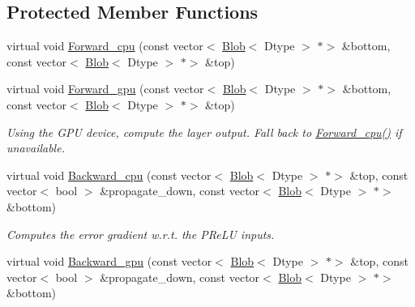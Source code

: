 \subsection*{Protected Member Functions}
\begin{DoxyCompactItemize}
\item 
virtual void \mbox{\hyperlink{classcaffe_1_1_p_re_l_u_layer_ab29811e077cc15d6751366d3f918acd6}{Forward\+\_\+cpu}} (const vector$<$ \mbox{\hyperlink{classcaffe_1_1_blob}{Blob}}$<$ Dtype $>$ $\ast$$>$ \&bottom, const vector$<$ \mbox{\hyperlink{classcaffe_1_1_blob}{Blob}}$<$ Dtype $>$ $\ast$$>$ \&top)
\item 
\mbox{\label{classcaffe_1_1_p_re_l_u_layer_a5f87617dbd3f561a6f7548dd09d5f486}} 
virtual void \mbox{\hyperlink{classcaffe_1_1_p_re_l_u_layer_a5f87617dbd3f561a6f7548dd09d5f486}{Forward\+\_\+gpu}} (const vector$<$ \mbox{\hyperlink{classcaffe_1_1_blob}{Blob}}$<$ Dtype $>$ $\ast$$>$ \&bottom, const vector$<$ \mbox{\hyperlink{classcaffe_1_1_blob}{Blob}}$<$ Dtype $>$ $\ast$$>$ \&top)
\begin{DoxyCompactList}\small\item\em Using the G\+PU device, compute the layer output. Fall back to \mbox{\hyperlink{classcaffe_1_1_p_re_l_u_layer_ab29811e077cc15d6751366d3f918acd6}{Forward\+\_\+cpu()}} if unavailable. \end{DoxyCompactList}\item 
virtual void \mbox{\hyperlink{classcaffe_1_1_p_re_l_u_layer_ab2e8ecd631bc37fdabecefbc91ee21a0}{Backward\+\_\+cpu}} (const vector$<$ \mbox{\hyperlink{classcaffe_1_1_blob}{Blob}}$<$ Dtype $>$ $\ast$$>$ \&top, const vector$<$ bool $>$ \&propagate\+\_\+down, const vector$<$ \mbox{\hyperlink{classcaffe_1_1_blob}{Blob}}$<$ Dtype $>$ $\ast$$>$ \&bottom)
\begin{DoxyCompactList}\small\item\em Computes the error gradient w.\+r.\+t. the P\+Re\+LU inputs. \end{DoxyCompactList}\item 
\mbox{\label{classcaffe_1_1_p_re_l_u_layer_a16aa9d25c3ba6af789a7e1fee8ae1dfa}} 
virtual void \mbox{\hyperlink{classcaffe_1_1_p_re_l_u_layer_a16aa9d25c3ba6af789a7e1fee8ae1dfa}{Backward\+\_\+gpu}} (const vector$<$ \mbox{\hyperlink{classcaffe_1_1_blob}{Blob}}$<$ Dtype $>$ $\ast$$>$ \&top, const vector$<$ bool $>$ \&propagate\+\_\+down, const vector$<$ \mbox{\hyperlink{classcaffe_1_1_blob}{Blob}}$<$ Dtype $>$ $\ast$$>$ \&bottom)

\end{DoxyCompactItemize}
